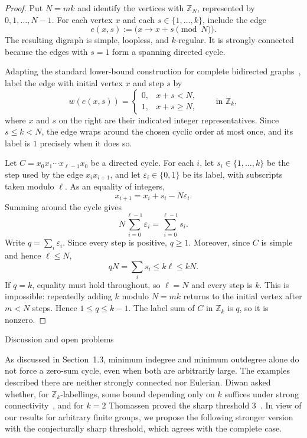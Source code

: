 \documentclass[11pt]{amsart}
\makeatletter
\def\section{\@startsection{section}{1}%
  \z@{1.5\linespacing\@plus.6\linespacing}{.65\linespacing}%
  {\normalfont\Large\bfseries\raggedright}}
\theoremstyle{remark}
\makeatother
\begin{document}
\begin{proof}
Put $N=mk$ and identify the vertices with $\mathbb Z_N$, represented by
$0,1,\ldots,N-1$.  For each vertex $x$ and each $s\in\{1,\ldots,k\}$,
include the edge
\[
  e(x,s):=\bigl(x\longrightarrow x+s\pmod N\bigr).
\]
The resulting digraph is simple, loopless, and $k$-regular.  It is
strongly connected because the edges with $s=1$ form a spanning
directed cycle.

Adapting the standard lower-bound construction for complete bidirected
graphs~\cite{MeszarosSteiner,Diwan}, label the edge with initial vertex
$x$ and step $s$ by
\[
  w(e(x,s))=
  \begin{cases}
    0,&x+s<N,\\
    1,&x+s\ge N,
  \end{cases}
  \qquad\text{in }\mathbb Z_k,
\]
where $x$ and $s$ on the right are their indicated integer
representatives.  Since $s\le k<N$, the edge wraps around the chosen
cyclic order at most once, and its label is $1$ precisely when it does so.

Let $C=x_0x_1\cdots x_{\ell-1}x_0$ be a directed cycle.  For each $i$,
let $s_i\in\{1,\ldots,k\}$ be the step used by the edge $x_ix_{i+1}$,
and let $\varepsilon_i\in\{0,1\}$ be its label, with subscripts taken
modulo $\ell$.  As an equality of integers,
\[
  x_{i+1}=x_i+s_i-N\varepsilon_i.
\]
Summing around the cycle gives
\[
  N\sum_{i=0}^{\ell-1}\varepsilon_i
  =\sum_{i=0}^{\ell-1}s_i.
\]
Write $q=\sum_i\varepsilon_i$.  Since every step is positive, $q\ge1$.
Moreover, since $C$ is simple and hence $\ell\le N$,
\[
  qN=\sum_i s_i\le k\ell\le kN.
\]
If $q=k$, equality must hold throughout, so $\ell=N$ and every step is
$k$.  This is impossible: repeatedly adding $k$ modulo $N=mk$ returns
to the initial vertex after $m<N$ steps.  Hence $1\le q\le k-1$.
The label sum of $C$ in $\mathbb Z_k$ is $q$, so it is nonzero.
\end{proof}

\section{Discussion and open problems}

As discussed in Section~1.3, minimum indegree and minimum outdegree
alone do not force a zero-sum cycle, even when both are arbitrarily
large.  The examples described there are neither strongly connected nor
Eulerian.  Diwan asked whether, for $\mathbb Z_k$-labellings, some bound
depending only on $k$ suffices under strong
connectivity~\cite{Diwan}, and for $k=2$ Thomassen proved the sharp
threshold $3$~\cite{Thomassen1992}.  In view of our results for arbitrary
finite groups, we propose the following stronger version with the
conjecturally sharp threshold, which agrees with the complete case.
\end{document}
